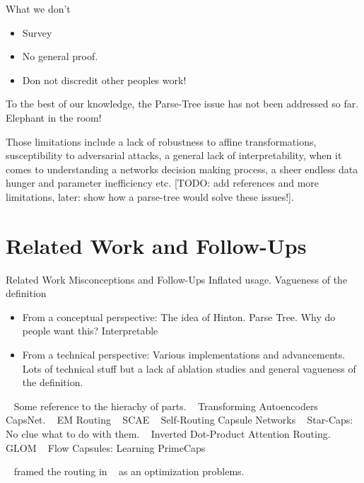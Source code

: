 \documentclass{article}
\begin{document}
What we don't
\begin{itemize}
	\item Survey
	\item No general proof.
	\item Don not discredit other peoples work!
\end{itemize}	

To the best of our knowledge, the Parse-Tree issue has not been addressed so far. Elephant in the room!




Those limitations include a lack of robustness to affine transformations, susceptibility to adversarial attacks, a general lack of interpretability, when it comes to understanding a networks decision making process, a sheer endless data hunger and parameter inefficiency etc. [TODO: add references and more limitations, later: show how a parse-tree would solve these issues!].

\section{Related Work and Follow-Ups}

Related Work
Misconceptions and Follow-Ups
Inflated usage.
Vagueness of the definition
\begin{itemize}
	\item From a conceptual perspective: The idea of Hinton. Parse Tree. Why do people want this? Interpretable
	\item From a technical perspective: Various implementations and advancements. Lots of technical stuff but a lack af ablation studies and general vagueness of the definition.
\end{itemize}


~\cite{cogsci/Hinton79} Some reference to the hierachy of parts.
~\cite{icann/HintonKW11} Transforming Autoencoders
~\cite{nips/SabourFH17} CapsNet.
~\cite{iclr/HintonSF18} EM Routing
~\cite{nips/KosiorekSTH19} SCAE
~\cite{nips/HahnPK19} Self-Routing Capsule Networks
~\cite{nips/AhmedT19} Star-Caps: No clue what to do with them.
~\cite{iclr/TsaiSGS20} Inverted Dot-Product Attention Routing.
~\cite{corr/Hinton2021} GLOM
~\cite{icml/SabourTYHF21} Flow Capsules: Learning PrimeCaps


~\cite{iclr/Wang018} framed the routing in ~\cite{nips/SabourFH17} as an optimization problems.
\end{document}
